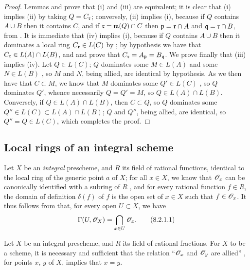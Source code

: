 \begin{proof}
\label{proof-1.8.1.5}
Lemmas  and  prove that (i) and (iii) are equivalent; it
is clear that (i) implies (ii) by taking $Q=C_\mathfrak{r}$; conversely, (ii)
implies (i), because if $Q$ contains $A\cup B$ then it contains $C$, and if
$\mathfrak{r}=\mathfrak{m}(Q)\cap C$ then $\mathfrak{p}=\mathfrak{r}\cap A$ and
$\mathfrak{q}=\mathfrak{r}\cap B$, from . It is immediate that (iv)
implies (i), because if $Q$ contains $A\cup B$ then it dominates a local ring
$C_\mathfrak{r}\in L(C)$ by ; by hypothesis we have that
$C_\mathfrak{r}\in L(A)\cap L(B)$, and  and  prove that
$C_\mathfrak{r}=A_\mathfrak{p}=B_\mathfrak{q}$. We prove finally that (iii)
implies (iv). Let $Q\in L(C)$; $Q$ dominates some $M\in L(A)$ and some $N\in
L(B)$ , so $M$ and $N$, being allied, are identical by hypothesis.
As we then have that $C\subset M$, we know that $M$ dominates some $Q'\in L(C)$
, so $Q$ dominates $Q'$, whence necessarily  $Q=Q'=M$,
so $Q\in L(A)\cap L(B)$. Conversely, if $Q\in L(A)\cap L(B)$, then $C\subset
Q$, so  $Q$ dominates some $Q''\in L(C)\subset L(A)\cap L(B)$; $Q$
and $Q''$, being allied, are identical, so $Q''=Q\in L(C)$, which completes the
proof.
\end{proof}

\subsection{Local rings of an integral scheme}
\label{subsection-local-rings-of-integral-scheme}

\begin{env}[8.2.1]
\label{1.8.2.1}
Let $X$ be an \emph{integral} prescheme, and $R$ its field of
rational functions, identical to the local ring of the generic point $a$ of $X$;
for all $x\in X$, we know that $\mathscr{O}_x$ can be canonically identified with a
subring of $R$ , and for every rational function $f\in R$, the
domain of definition $\delta(f)$ of $f$ is the open set of $x\in X$ such that
$f\in\mathscr{O}_x$. It thus follows from  that, for every open $U\subset X$,
we have
\[
  \Gamma(U,\mathscr{O}_X)=\bigcap_{x\in U}\mathscr{O}_x.
  \tag{8.2.1.1}
\]
\end{env}

\begin{prop}[8.2.2]
\label{1.8.2.2}
Let $X$ be an integral prescheme,
and $R$ its field of rational fractions. For $X$ to be a scheme, it is
necessary and sufficient that the relation ``$\mathscr{O}_x$ and $\mathscr{O}_y$ are allied''
, for points $x$, $y$ of $X$, implies that $x=y$.
\end{prop}

